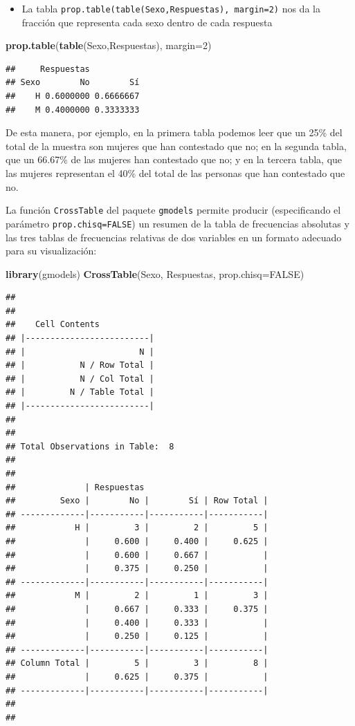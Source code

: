 \documentclass[]{book}
\newenvironment{Shaded}{\begin{snugshade}}{\end{snugshade}}
\newcommand{\DataTypeTok}[1]{\textcolor[rgb]{0.13,0.29,0.53}{#1}}
\newcommand{\DecValTok}[1]{\textcolor[rgb]{0.00,0.00,0.81}{#1}}
\newcommand{\KeywordTok}[1]{\textcolor[rgb]{0.13,0.29,0.53}{\textbf{#1}}}
\newcommand{\NormalTok}[1]{#1}
\newcommand{\OtherTok}[1]{\textcolor[rgb]{0.56,0.35,0.01}{#1}}
\providecommand{\tightlist}{%
  \setlength{\itemsep}{0pt}\setlength{\parskip}{0pt}}
\theoremstyle{definition}
\theoremstyle{definition}
\theoremstyle{definition}
\theoremstyle{remark}
\begin{document}
\begin{itemize}
\tightlist
\item
  La tabla \texttt{prop.table(table(Sexo,Respuestas),\ margin=2)} nos da la fracción que representa cada sexo dentro de cada respuesta
\end{itemize}

\begin{Shaded}
\begin{Highlighting}[]
\KeywordTok{prop.table}\NormalTok{(}\KeywordTok{table}\NormalTok{(Sexo,Respuestas), }\DataTypeTok{margin=}\DecValTok{2}\NormalTok{)}
\end{Highlighting}
\end{Shaded}

\begin{verbatim}
##     Respuestas
## Sexo        No        Sí
##    H 0.6000000 0.6666667
##    M 0.4000000 0.3333333
\end{verbatim}

De esta manera, por ejemplo, en la primera tabla podemos leer que un 25\% del total de la muestra son mujeres que han contestado que no; en la segunda tabla, que un 66.67\% de las mujeres han contestado que no; y en la tercera tabla, que las mujeres representan el 40\% del total de las personas que han contestado que no.

La función \texttt{CrossTable} del paquete \texttt{gmodels} permite producir (especificando el parámetro \texttt{prop.chisq=FALSE}) un resumen de la tabla de frecuencias absolutas y las tres tablas de frecuencias relativas de dos variables en un formato adecuado para su visualización:

\begin{Shaded}
\begin{Highlighting}[]
\KeywordTok{library}\NormalTok{(gmodels) }
\KeywordTok{CrossTable}\NormalTok{(Sexo, Respuestas, }\DataTypeTok{prop.chisq=}\OtherTok{FALSE}\NormalTok{)}
\end{Highlighting}
\end{Shaded}

\begin{verbatim}
## 
##  
##    Cell Contents
## |-------------------------|
## |                       N |
## |           N / Row Total |
## |           N / Col Total |
## |         N / Table Total |
## |-------------------------|
## 
##  
## Total Observations in Table:  8 
## 
##  
##              | Respuestas 
##         Sexo |        No |        Sí | Row Total | 
## -------------|-----------|-----------|-----------|
##            H |         3 |         2 |         5 | 
##              |     0.600 |     0.400 |     0.625 | 
##              |     0.600 |     0.667 |           | 
##              |     0.375 |     0.250 |           | 
## -------------|-----------|-----------|-----------|
##            M |         2 |         1 |         3 | 
##              |     0.667 |     0.333 |     0.375 | 
##              |     0.400 |     0.333 |           | 
##              |     0.250 |     0.125 |           | 
## -------------|-----------|-----------|-----------|
## Column Total |         5 |         3 |         8 | 
##              |     0.625 |     0.375 |           | 
## -------------|-----------|-----------|-----------|
## 
## 
\end{verbatim}
\end{document}
